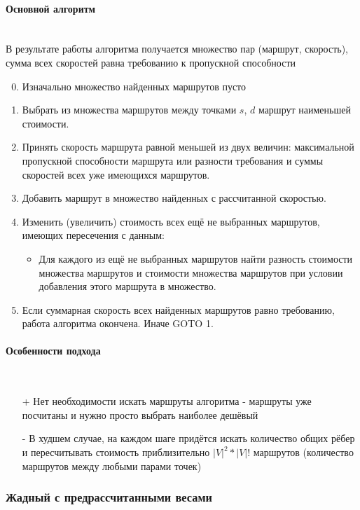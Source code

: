 \documentclass[a4paper]{article}
\begin{document}
\paragraph{Основной алгоритм}\mbox{}\\
В результате работы алгоритма получается множество пар (маршрут, скорость), сумма всех скоростей равна требованию к пропускной способности
\begin{enumerate}
\setcounter{enumi}{-1}
\item Изначально множество найденных маршрутов пусто
\item Выбрать из множества маршрутов между точками $s$, $d$ маршрут наименьшей стоимости.
\item Принять скорость маршрута равной меньшей из двух величин: максимальной пропускной способности маршрута или разности требования и суммы скоростей всех уже имеющихся маршрутов.
\item Добавить маршрут в множество найденных с рассчитанной скоростью. 
\item Изменить (увеличить) стоимость всех ещё не выбранных маршрутов, имеющих пересечения с данным:
\begin{itemize}
\item Для каждого из ещё не выбранных маршрутов найти разность стоимости множества маршрутов и стоимости множества маршрутов при условии добавления этого маршрута в множество.
\end{itemize}
\item Если суммарная скорость всех найденных маршрутов равно требованию, работа алгоритма окончена. Иначе  GOTO 1.
\end{enumerate}
\paragraph{Особенности подхода}\mbox{}\\
\begin{itemize}
\item[+] Нет необходимости искать маршруты алгоритма - маршруты уже посчитаны и нужно просто выбрать наиболее дешёвый
\item[-] В худшем случае, на каждом шаге придётся искать количество общих рёбер и пересчитывать стоимость приблизительно $|V|^2 * |V|!$ маршрутов (количество маршрутов между любыми парами точек)
\end{itemize}

\subsubsection{Жадный с предрассчитанными весами}
\end{document}
